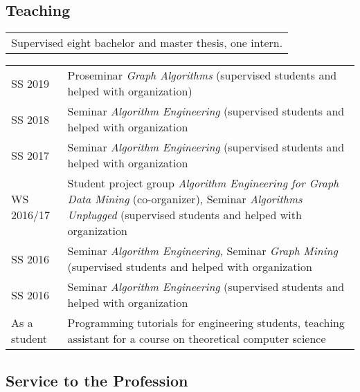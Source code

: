 \documentclass[11pt, a4paper]{scrartcl}
\begin{document}
\subsection*{Teaching}
\begin{tabular}{l}
Supervised eight bachelor and master thesis, one intern.\\
\end{tabular}

\begin{tabular}{p{2.1cm}p{12.0cm}}
SS 2019&Proseminar \emph{Graph Algorithms} (supervised students and helped with organization)\\
SS 2018&Seminar \emph{Algorithm Engineering} (supervised students and helped with organization\\
SS 2017&Seminar \emph{Algorithm Engineering} (supervised students and helped with organization\\
WS 2016/17&Student project group \emph{Algorithm Engineering for Graph Data Mining} (co-organizer), Seminar \emph{Algorithms Unplugged} (supervised students and helped with organization\\
SS 2016& Seminar \emph{Algorithm Engineering}, Seminar \emph{Graph Mining} (supervised students and helped with organization\\
SS 2016&Seminar \emph{Algorithm Engineering} (supervised students and helped with organization\\
As a student&Programming tutorials for engineering students, teaching assistant for a course on theoretical computer science\\
\end{tabular}

\subsection*{Service to the Profession}
\end{document}
